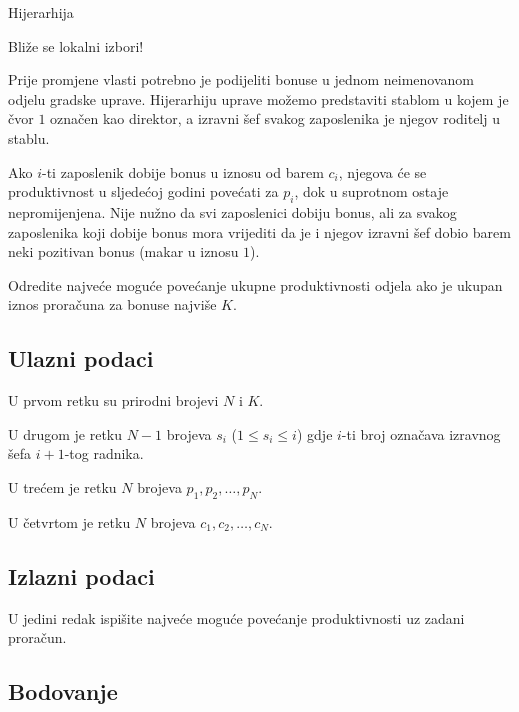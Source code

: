 \begin{statement}[
  problempoints=100,
  timelimit=1 sekunda,
  memorylimit=1024 MiB,
]{Hijerarhija}\

Bliže se lokalni izbori!

Prije promjene vlasti potrebno je podijeliti bonuse u jednom neimenovanom odjelu gradske uprave. Hijerarhiju uprave možemo predstaviti stablom u kojem je čvor $1$ označen kao direktor, a izravni šef svakog zaposlenika je njegov roditelj u stablu.

Ako $i$-ti zaposlenik dobije bonus u iznosu od barem $c_i$, njegova će se produktivnost u sljedećoj godini povećati za $p_i$, dok u suprotnom ostaje nepromijenjena. Nije nužno da svi zaposlenici dobiju bonus, ali za svakog zaposlenika koji dobije bonus mora vrijediti da je i njegov izravni šef dobio barem neki pozitivan bonus (makar u iznosu $1$).

Odredite najveće moguće povećanje ukupne produktivnosti odjela ako je ukupan iznos proračuna za bonuse najviše $K$.

\subsection*{Ulazni podaci}

U prvom retku su prirodni brojevi $N$ i $K$.

U drugom je retku $N - 1$ brojeva $s_i$ ($1 \leq s_i \leq i$) gdje $i$-ti broj označava izravnog šefa $i+1$-tog radnika.

U trećem je retku $N$ brojeva $p_1, p_2, \ldots, p_N$.

U četvrtom je retku $N$ brojeva $c_1, c_2, \ldots, c_N$. 

\subsection*{Izlazni podaci}

U jedini redak ispišite najveće moguće povećanje produktivnosti uz zadani proračun.

\subsection*{Bodovanje}


\end{statement}

